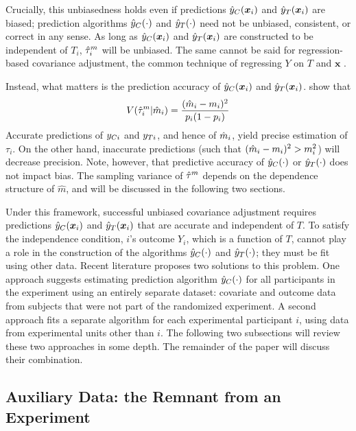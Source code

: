 Crucially, this unbiasedness holds even if predictions $\hat{y}_C(\bm{x}_i)$ and $\hat{y}_T(\bm{x}_i)$ are biased; prediction algorithms $\hat{y}_C(\cdot)$ and $\hat{y}_T(\cdot)$ need not be unbiased, consistent, or correct in any sense.
As long as $\hat{y}_C(\bm{x}_i)$ and $\hat{y}_T(\bm{x}_i)$ are constructed to be independent
of $T_i$, $\hat{\tau}_i^m$ will be unbiased.
The same cannot be said for regression-based covariance
adjustment, the common technique of regressing $Y$ on $T$ and $\bm{x}$
\citep{freedman2008regression}.

Instead, what matters is the prediction
accuracy of $\hat{y}_C(\bm{x}_i)$ and $\hat{y}_T(\bm{x}_i)$.
\citet{loop} show that
\begin{equation}
V(\hat{\tau}_i^m|\hat{m}_i)=\frac{(\hat{m}_i-m_i)^2}{p_i(1-p_i)}
\end{equation}
Accurate predictions of $y_{Ci}$ and $y_{Ti}$, and hence of $\hat{m}_i$, yield precise estimation of $\tau_i$.
On the other hand, inaccurate predictions (such that
$(\hat{m}_i-m_i)^2>m_i^2$) will decrease precision.
Note, however, that predictive accuracy of $\hat{y}_C(\cdot)$ or $\hat{y}_T(\cdot)$ does not impact bias.
The sampling variance of $\hat{\tau}^m$ depends on the dependence structure of
$\hat{m}$, and will be discussed in the following two sections.

Under this framework, successful unbiased covariance adjustment
requires predictions $\hat{y}_C(\bm{x}_i) $ and $\hat{y}_T(\bm{x}_i) $ that are accurate and
independent of $T$.
To satisfy the independence condition, $i$'s outcome $Y_i$, which is a
function of $T$, cannot play a role in the construction of the algorithms $\hat{y}_C(\cdot)$ and
$\hat{y}_T(\cdot)$; they must be fit using other data.
Recent literature proposes two solutions to this problem.
 One approach \citep{rebarEDM} suggests
estimating prediction algorithm $\hat{y}_C(\cdot) $ for all participants in the
experiment using an entirely separate dataset: covariate and outcome data from subjects
that were not part of the randomized experiment.
A second approach \citep{loop} fits a separate algorithm for each
experimental participant $i$, using data from experimental units other
than $i$.
The following two subsections will review these two approaches in some
depth.
The remainder of the paper will discuss their combination.

\subsection{Auxiliary Data: the Remnant from an Experiment}\label{sec:intro.remant}

